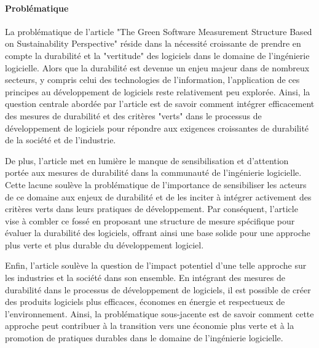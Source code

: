 \paragraph{Problématique}
La problématique de l'article "The Green Software Measurement Structure Based on Sustainability Perspective" réside dans la nécessité croissante de prendre en compte la durabilité et la "vertitude" des logiciels dans le domaine de l'ingénierie logicielle. Alors que la durabilité est devenue un enjeu majeur dans de nombreux secteurs, y compris celui des technologies de l'information, l'application de ces principes au développement de logiciels reste relativement peu explorée. Ainsi, la question centrale abordée par l'article est de savoir comment intégrer efficacement des mesures de durabilité et des critères "verts" dans le processus de développement de logiciels pour répondre aux exigences croissantes de durabilité de la société et de l'industrie.

De plus, l'article met en lumière le manque de sensibilisation et d'attention portée aux mesures de durabilité dans la communauté de l'ingénierie logicielle. Cette lacune soulève la problématique de l'importance de sensibiliser les acteurs de ce domaine aux enjeux de durabilité et de les inciter à intégrer activement des critères verts dans leurs pratiques de développement. Par conséquent, l'article vise à combler ce fossé en proposant une structure de mesure spécifique pour évaluer la durabilité des logiciels, offrant ainsi une base solide pour une approche plus verte et plus durable du développement logiciel.

Enfin, l'article soulève la question de l'impact potentiel d'une telle approche sur les industries et la société dans son ensemble. En intégrant des mesures de durabilité dans le processus de développement de logiciels, il est possible de créer des produits logiciels plus efficaces, économes en énergie et respectueux de l'environnement. Ainsi, la problématique sous-jacente est de savoir comment cette approche peut contribuer à la transition vers une économie plus verte et à la promotion de pratiques durables dans le domaine de l'ingénierie logicielle.

